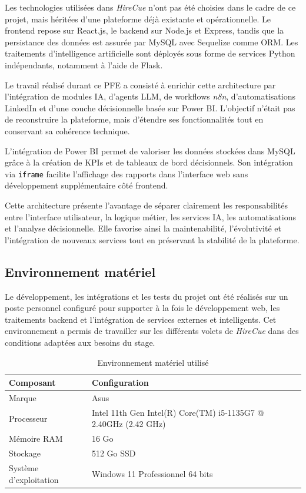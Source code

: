 Les technologies utilisées dans \textit{HireCue} n'ont pas été choisies dans le cadre de ce projet, mais héritées d'une plateforme déjà existante et opérationnelle. Le frontend repose sur React.js, le backend sur Node.js et Express, tandis que la persistance des données est assurée par MySQL avec Sequelize comme ORM. Les traitements d'intelligence artificielle sont déployés sous forme de services Python indépendants, notamment à l'aide de Flask.

Le travail réalisé durant ce PFE a consisté à enrichir cette architecture par l'intégration de modules IA, d'agents LLM, de workflows \textit{n8n}, d'automatisations LinkedIn et d'une couche décisionnelle basée sur Power BI. L'objectif n'était pas de reconstruire la plateforme, mais d'étendre ses fonctionnalités tout en conservant sa cohérence technique.

L'intégration de Power BI permet de valoriser les données stockées dans MySQL grâce à la création de KPIs et de tableaux de bord décisionnels. Son intégration via \texttt{iframe} facilite l'affichage des rapports dans l'interface web sans développement supplémentaire côté frontend.

Cette architecture présente l'avantage de séparer clairement les responsabilités entre l'interface utilisateur, la logique métier, les services IA, les automatisations et l'analyse décisionnelle. Elle favorise ainsi la maintenabilité, l'évolutivité et l'intégration de nouveaux services tout en préservant la stabilité de la plateforme.


\subsection{Environnement matériel}

Le développement, les intégrations et les tests du projet ont été réalisés sur un poste personnel configuré pour supporter à la fois le développement web, les traitements backend et l'intégration de services externes et intelligents. Cet environnement a permis de travailler sur les différents volets de \textit{HireCue} dans des conditions adaptées aux besoins du stage.

\begin{table}[H]
\centering
\renewcommand{\arraystretch}{1.3}
\begin{tabular}{|p{5cm}|p{9cm}|}
\hline
\rowcolor{TableHeaderBlue}
\textbf{Composant} & \textbf{Configuration} \\
\hline
Marque & Asus \\
\hline
Processeur & Intel 11th Gen Intel(R) Core(TM) i5-1135G7 @ 2.40GHz (2.42 GHz) \\
\hline
Mémoire RAM & 16 Go \\
\hline
Stockage & 512 Go SSD \\
\hline
Système d'exploitation & Windows 11 Professionnel 64 bits \\
\hline
\end{tabular}
\caption{Environnement matériel utilisé}
\end{table}


